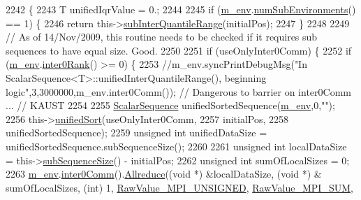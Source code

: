 \begin{DoxyCode}
2242 \{
2243   T unifiedIqrValue = 0.;
2244 
2245   \textcolor{keywordflow}{if} (\hyperlink{class_q_u_e_s_o_1_1_scalar_sequence_a71618cd6351b29361b437af68447a4c8}{m\_env}.\hyperlink{class_q_u_e_s_o_1_1_base_environment_ac0345f57e31ef7833e379ed972bd094d}{numSubEnvironments}() == 1) \{
2246     \textcolor{keywordflow}{return} this->\hyperlink{class_q_u_e_s_o_1_1_scalar_sequence_a0bde4bf373cbe6d6245b1ef8693e6053}{subInterQuantileRange}(initialPos);
2247   \}
2248 
2249   \textcolor{comment}{// As of 14/Nov/2009, this routine needs to be checked if it requires sub sequences to have equal size.
       Good.}
2250 
2251   \textcolor{keywordflow}{if} (useOnlyInter0Comm) \{
2252     \textcolor{keywordflow}{if} (\hyperlink{class_q_u_e_s_o_1_1_scalar_sequence_a71618cd6351b29361b437af68447a4c8}{m\_env}.\hyperlink{class_q_u_e_s_o_1_1_base_environment_ae106b5bb8a80b655b88b3a26b1e7c185}{inter0Rank}() >= 0) \{
2253       \textcolor{comment}{//m\_env.syncPrintDebugMsg("In ScalarSequence<T>::unifiedInterQuantileRange(), beginning
       logic",3,3000000,m\_env.inter0Comm()); // Dangerous to barrier on inter0Comm ... // KAUST}
2254 
2255       \hyperlink{class_q_u_e_s_o_1_1_scalar_sequence_af7084e62a902ffefc8a49e317ac45e7c}{ScalarSequence} unifiedSortedSequence(\hyperlink{class_q_u_e_s_o_1_1_scalar_sequence_a71618cd6351b29361b437af68447a4c8}{m\_env},0,\textcolor{stringliteral}{""});
2256       this->\hyperlink{class_q_u_e_s_o_1_1_scalar_sequence_a8a77f546238c4b419d926a0c76613cd8}{unifiedSort}(useOnlyInter0Comm,
2257                         initialPos,
2258                         unifiedSortedSequence);
2259       \textcolor{keywordtype}{unsigned} \textcolor{keywordtype}{int} unifiedDataSize = unifiedSortedSequence.subSequenceSize();
2260     
2261       \textcolor{keywordtype}{unsigned} \textcolor{keywordtype}{int} localDataSize = this->\hyperlink{class_q_u_e_s_o_1_1_scalar_sequence_a0288ea295eedc216a1617b3286f6f3a0}{subSequenceSize}() - initialPos;
2262       \textcolor{keywordtype}{unsigned} \textcolor{keywordtype}{int} sumOfLocalSizes = 0;
2263       \hyperlink{class_q_u_e_s_o_1_1_scalar_sequence_a71618cd6351b29361b437af68447a4c8}{m\_env}.\hyperlink{class_q_u_e_s_o_1_1_base_environment_a689e4d140c74d495d97eb498714a4b82}{inter0Comm}().\hyperlink{class_q_u_e_s_o_1_1_mpi_comm_a72e137e60ef8060efb1ee5fc874fa4b8}{Allreduce}((\textcolor{keywordtype}{void} *) &localDataSize, (\textcolor{keywordtype}{void} *) &
      sumOfLocalSizes, (\textcolor{keywordtype}{int}) 1, \hyperlink{_mpi_comm_8h_a06cbfbc33436f6e0dc8a48ff3c49bdfc}{RawValue\_MPI\_UNSIGNED}, \hyperlink{_mpi_comm_8h_afbf78d291c032aa7f512bc566cee2bd1}{RawValue\_MPI\_SUM},

\end{DoxyCode}
